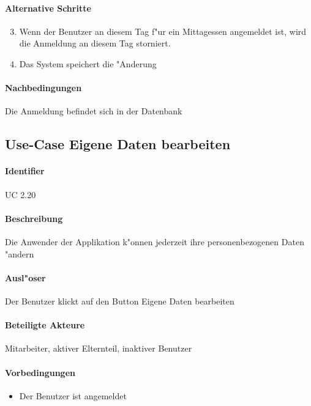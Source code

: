   \paragraph{Alternative Schritte}
  \begin{enumerate}
  \setcounter{enumi}{2}
   \item  Wenn der Benutzer an diesem Tag f"ur ein Mittagessen angemeldet ist, wird die Anmeldung an diesem Tag storniert.
   \item Das System speichert die "Anderung
  \end{enumerate}

  \paragraph{Nachbedingungen}
  Die Anmeldung befindet sich in der Datenbank

  
    \newpage
 \subsection{Use-Case Eigene Daten bearbeiten}
  \paragraph{Identifier}
  UC 2.20
  \paragraph{Beschreibung}
  Die Anwender der Applikation k"onnen jederzeit ihre personenbezogenen Daten "andern
  \paragraph{Ausl"oser}
  Der Benutzer klickt auf den Button \dq Eigene Daten bearbeiten\dq
  \paragraph{Beteiligte Akteure}   \leavevmode \newline
    Mitarbeiter, aktiver Elternteil, inaktiver Benutzer
  \paragraph{Vorbedingungen}
  \begin{itemize}
   \item Der Benutzer ist angemeldet
  \end{itemize}

